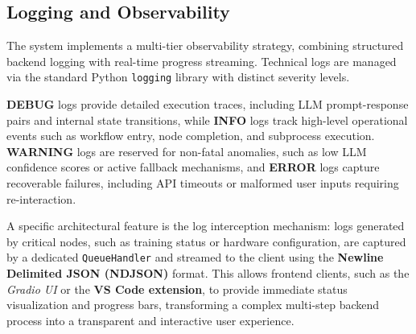 \subsection{Logging and Observability}

The system implements a multi-tier observability strategy, combining structured backend logging with real-time progress streaming. Technical logs are managed via the standard Python \texttt{logging} library with distinct severity levels.

\textbf{DEBUG} logs provide detailed execution traces, including LLM prompt-response pairs and internal state transitions, while \textbf{INFO} logs track high-level operational events such as workflow entry, node completion, and subprocess execution. \textbf{WARNING} logs are reserved for non-fatal anomalies, such as low LLM confidence scores or active fallback mechanisms, and \textbf{ERROR} logs capture recoverable failures, including API timeouts or malformed user inputs requiring re-interaction.

A specific architectural feature is the log interception mechanism: logs generated by critical nodes, such as training status or hardware configuration, are captured by a dedicated \texttt{QueueHandler} and streamed to the client using the \textbf{Newline Delimited JSON (NDJSON)} format. This allows frontend clients, such as the \textit{Gradio UI} or the \textbf{VS Code extension}, to provide immediate status visualization and progress bars, transforming a complex multi-step backend process into a transparent and interactive user experience.
